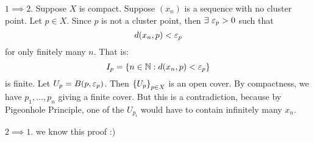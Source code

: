 \documentclass{article}
\begin{document}
\begin{pf}[source=Primary Source Material]
    $ 1 \implies 2 $.
    Suppose $ X $ is compact. Suppose $ (x_{n}) $ is a sequence with no cluster point.
    Let $ p \in X $. Since $ p $ is not a cluster point, then $ \exists \, \operatorname{\varepsilon}_{p} > 0 $ such that
    \begin{equation*}
        d(x_{n}, p) < \operatorname{\varepsilon}_{p}
    \end{equation*}
    for only finitely many $ n $. That is:
    \begin{equation*}
        I_{p} = \left\{{n \in \mathbb{N} : d(x_{n}, p) < \operatorname{\varepsilon}_{p}}\right\}
    \end{equation*}
    is finite. \vsp
    Let $ U_{p} = B(p, \operatorname{\varepsilon}_{p}) $. Then $ \left\{{U_{p}}\right\}_{p \in X} $ is an open cover.
    By compactness, we have $ p_{1}, \dots, p_{n} $ giving a finite cover. \vsp
    But this is a contradiction, because by Pigeonhole Principle,
    one of the $ U_{p_{i}} $ would have to contain infinitely many $ x_{n} $. \npgh

    $ 2 \implies 1 $. we know this proof :)
\end{pf}
\end{document}
